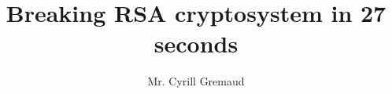 \documentclass[
   major=tic,
   type=deepening,		%
   confidential=false,
   lang=en,
   path=\msepath,
   twoside
]{\msepath/mse-thesis}
\title{Breaking RSA cryptosystem in 27 seconds}
\author{Mr. Cyrill Gremaud}
\institute{Linux Foundation}
\institute{RSA Foundation}
\institute{RSA Foundation}
\institute{Idle islands AG}
\begin{document}


   
   


   \inserttoc


   
   
   
   
   
   

	
   \insertglossary %
   \insertbibliography
   \insertlof
   \insertlot
   
  


   \begin{appendix}
      
      
      
   \end{appendix}
\end{document}
